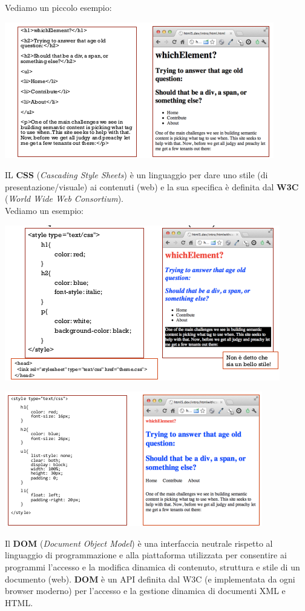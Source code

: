 \documentclass[a4paper,12pt, oneside]{book}
\begin{document}
Vediamo un piccolo esempio:
\begin{center}
\includegraphics[scale=0.9]{img/html.png}
\end{center}
IL \textbf{CSS} (\textit{Cascading Style Sheets}) è un linguaggio per dare uno stile (di presentazione/visuale) ai contenuti (web) e la sua specifica è definita dal \textbf{W3C} (\textit{World Wide Web Consortium}). 
\\Vediamo un esempio:
\begin{center}
\includegraphics[scale=0.9]{img/css.png}
\end{center}
\begin{center}
\includegraphics[scale=0.9]{img/css2.png}
\end{center}
Il \textbf{DOM} (\textit{Document Object Model}) è una interfaccia neutrale rispetto al linguaggio di programmazione e alla piattaforma utilizzata per consentire ai programmi l'accesso e la modifica dinamica di contenuto, struttura e stile di un documento (web). \textbf{DOM} è un API definita dal W3C (e implementata da ogni browser moderno) per l'accesso e la gestione dinamica di documenti XML e HTML.\\
\end{document}
